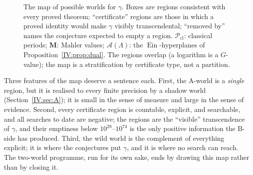\documentclass[11pt,a4paper]{article}
\newcommand{\Ein}{\operatorname{Ein}}
\newcommand{\EE}{\mathbf E}
\newcommand{\GG}{\mathbf G}
\newcommand{\MM}{\mathbf M}
\newcommand{\shear}{\mathfrak s}
\newcommand{\Aff}{\mathcal A}
\theoremstyle{definition}
\theoremstyle{remark}
\numberwithin{equation}{section}
\begin{document}
\begin{figure}[t]
\caption{The map of possible worlds for $\gamma$. Boxes are regions consistent with every
proved theorem; ``certificate'' regions are those in which a proved identity would make $\gamma$
visibly transcendental; ``removed by'' names the conjecture expected to empty a region. $\mathcal P_{\mathrm{cl}}$: classical periods; $\MM$: Mahler values;
$\Aff(\Lambda)$: the $\Ein$-hyperplanes of Proposition~\ref{IV:prop:dual}. The regions
overlap (a logarithm is a $G$-value); the map is a stratification by certificate type,
not a partition.}
\label{IV:fig:map}
\end{figure}

Three features of the map deserve a sentence each. First, the $\mathrm A$-world is a
\emph{single} region, but it is realised to every finite precision by a shadow world
(Section~\ref{IV:sec:A}); it is small in the sense of measure and large in the sense of
evidence. Second, every certificate region is countable, explicit, and searchable, and all
searches to date are negative; the regions are the ``visible'' transcendence of $\gamma$,
and their emptiness below $10^{28}$--$10^{74}$ is the only positive information the
$\mathrm B$-side has produced. Third, the wild world is the complement of everything
explicit; it is where the conjectures put $\gamma$, and it is where no search can reach.
The two-world programme, run for its own sake, ends by drawing this map rather than by
closing it.
\end{document}
